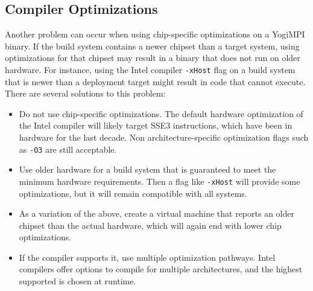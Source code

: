 \documentclass{article}
\begin{document}
\subsection{Compiler Optimizations}
Another problem can occur when using chip-specific optimizations on a YogiMPI binary.  If the build system contains a newer chipset than a target system, using optimizations for that chipset may result in a binary that does not run on older hardware.  For instance, using the Intel compiler \texttt{-xHost} flag on a build system that is newer than a deployment target might result in code that cannot execute. 
There are several solutions to this problem:
\begin{itemize}
\item Do not use chip-specific optimizations.  The default hardware optimization of the Intel compiler will likely target SSE3 instructions, which have been in hardware for the last decade. Non architecture-specific optimization flags such as \texttt{-O3} are still acceptable.
\item Use older hardware for a build system that is guaranteed to meet the minimum hardware requirements. Then a flag like \texttt{-xHost} will provide some optimizations, but it will remain compatible with all systems.
\item As a variation of the above, create a virtual machine that reports an older chipset than the actual hardware, which will again end with lower chip optimizations.
\item If the compiler supports it, use multiple optimization pathways. Intel compilers offer options to compile for multiple architectures, and the highest supported is chosen at runtime.
\end{itemize}
\end{document}
